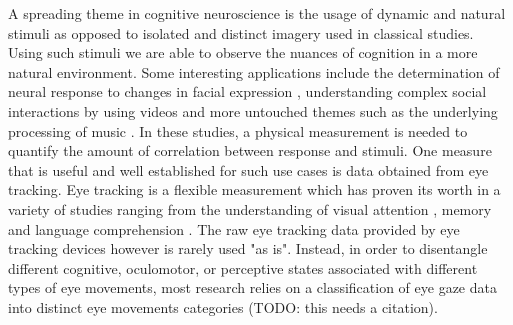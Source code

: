 A spreading theme in cognitive neuroscience is the usage of dynamic and natural stimuli as opposed to isolated and distinct imagery used in classical studies. Using such stimuli we are able to observe the nuances of cognition in a more natural environment. Some interesting applications include the determination of neural response to changes in facial expression \citep{Harris2014}, understanding complex social interactions by using videos \citep{Tikka2012} and more untouched themes such as the underlying processing of music \citep{Toiviainen2014}.  In these studies, a physical measurement is needed to quantify the amount of correlation between response and stimuli. One measure that is useful and well established for such use cases is data obtained from eye tracking. Eye tracking is a flexible measurement which has proven its worth in a variety of studies ranging from the understanding of visual attention \citep{HantaoLiu2011}, memory \citep{Hannula2010} and language comprehension \citep{Gordon2006}. The raw eye tracking data provided by eye tracking devices however is rarely used "as is". Instead, in order to disentangle different cognitive, oculomotor, or perceptive states associated with different types of eye movements, most research relies on a classification of eye gaze data into distinct eye movements categories (TODO: this needs a citation). \\
